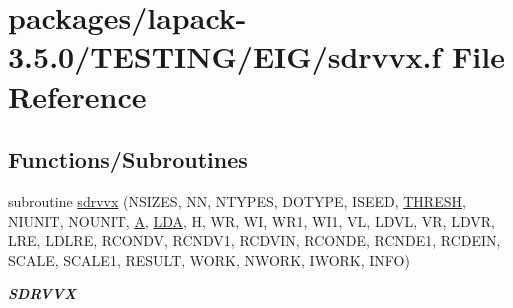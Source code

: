 \hypertarget{sdrvvx_8f}{}\section{packages/lapack-\/3.5.0/\+T\+E\+S\+T\+I\+N\+G/\+E\+I\+G/sdrvvx.f File Reference}
\label{sdrvvx_8f}
\subsection*{Functions/\+Subroutines}
\begin{DoxyCompactItemize}
\item 
subroutine \hyperlink{group__single__eig_ga91d3493bce6a97430fded1ad19b1bead}{sdrvvx} (N\+S\+I\+Z\+E\+S, N\+N, N\+T\+Y\+P\+E\+S, D\+O\+T\+Y\+P\+E, I\+S\+E\+E\+D, \hyperlink{zlaqgs_8c_a0656018abfc9fa2821827415f5d5ea57}{T\+H\+R\+E\+S\+H}, N\+I\+U\+N\+I\+T, N\+O\+U\+N\+I\+T, \hyperlink{classA}{A}, \hyperlink{example__user_8c_ae946da542ce0db94dced19b2ecefd1aa}{L\+D\+A}, H, W\+R, W\+I, W\+R1, W\+I1, V\+L, L\+D\+V\+L, V\+R, L\+D\+V\+R, L\+R\+E, L\+D\+L\+R\+E, R\+C\+O\+N\+D\+V, R\+C\+N\+D\+V1, R\+C\+D\+V\+I\+N, R\+C\+O\+N\+D\+E, R\+C\+N\+D\+E1, R\+C\+D\+E\+I\+N, S\+C\+A\+L\+E, S\+C\+A\+L\+E1, R\+E\+S\+U\+L\+T, W\+O\+R\+K, N\+W\+O\+R\+K, I\+W\+O\+R\+K, I\+N\+F\+O)
\begin{DoxyCompactList}\small\item\em {\bfseries S\+D\+R\+V\+V\+X} \end{DoxyCompactList}\end{DoxyCompactItemize}
